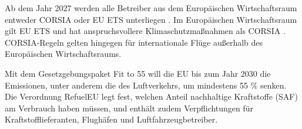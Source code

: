 Ab dem Jahr 2027 werden alle Betreiber aus dem Europäischen Wirtschaftsraum 
entweder CORSIA oder EU ETS unterliegen \cite{uba_aviation_2023}.
Im Europäischen Wirtschaftsraum gilt EU ETS und hat anspruchsvollere 
Klimaschutzmaßnahmen als CORSIA \cite{uba_aviation_2023}.
CORSIA-Regeln gelten hingegen für internationale Flüge außerhalb des Europäischen Wirtschaftsraums.

Mit dem Gesetzgebungspaket \glqq Fit to 55 \grqq{} will die EU bis zum Jahr 2030 die Emissionen, 
unter anderem die des Luftverkehrs, um mindestens 55 \% senken.
Die Verordnung RefuelEU legt fest, welchen Anteil nachhaltige Kraftstoffe (SAF) am Verbrauch haben müssen, 
und enthält zudem Verpflichtungen für Kraftstofflieferanten, Flughäfen und Luftfahrzeugbetreiber.

